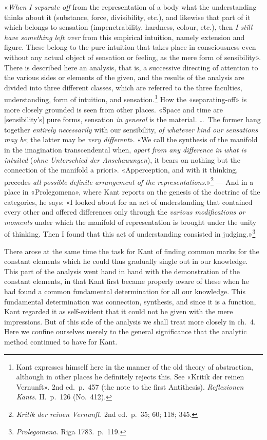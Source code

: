 \documentclass[12pt,a4paper]{article}
\newcommand{\opage}[1]{\marginnote{\footnotesize\textit{[#1]}}}
\begin{document}
«\emph{When I separate off} from the representation of a body what the
understanding thinks about it (substance, force, divisibility, etc.), and
likewise that part of it which belongs to sensation (impenetrability,
hardness, colour, etc.), then \emph{I still have something left over} from this
empirical intuition, namely extension and figure. These belong to the pure
intuition that takes place in consciousness even without any actual object
of sensation or feeling, as the mere form of sensibility». There is
described here an analysis, that is, a successive directing of attention to
the various sides or elements of the given, and the results of the analysis
are divided into three different classes, which are referred to the three
faculties, understanding, form of intuition, and sensation.\footnote{Kant
expresses himself here in the manner of the old theory of abstraction,
although in other places he definitely rejects this. See «Kritik der reinen
Vernunft». 2nd ed.\ p.\ 457 (the note to the first Antithesis).
\textit{Reflexionen Kants.} II.\ p.\ 126 (No.\ 412).} How the
«separating-off» is more closely grounded is seen from other places.
«Space and time are [sensibility's] pure forms, sensation \emph{in general} is the
material. \ldots\ The former hang together \emph{entirely necessarily} with our
sensibility, \emph{of whatever kind our sensations may be}; the latter may be \emph{very
different}». «We call the synthesis of the manifold in the imagination
transcendental when, \emph{apart from any difference in what is intuited} (\textit{ohne
Unterschied der Anschauungen}), it bears on nothing but the connection of
the manifold a priori». «Apperception, and with it thinking, precedes \emph{all
possible definite arrangement of the representations}.»\footnote{\textit{Kritik
der reinen Vernunft.} 2nd ed.\ p.\ 35; 60; 118; 345.} --- And in a place in
«Prolegomena», where Kant reports on the genesis of the doctrine of the
categories, he says: «I looked about for an act of understanding that
contained every other and offered differences only through the \emph{various
modifications or moments} under which the manifold of representation is
brought under the unity of thinking. Then I found that this act of
understanding consisted in judging.»\footnote{\textit{Prolegomena.} Riga
1783.\ p.\ 119.}

There arose at the same time the task for Kant of finding common marks for
the constant elements which he could thus gradually single out in our
knowledge. This \opage{28}part of the analysis went hand in hand with the
demonstration of the constant elements, in that Kant first became properly
aware of these when he had found a common fundamental determination for all
our knowledge. This fundamental determination was connection, synthesis,
and since it is a function, Kant regarded it as self-evident that it could
not be given with the mere impressions. But of this side of the analysis we
shall treat more closely in ch.\ 4. Here we confine ourselves merely to the
general significance that the analytic method continued to have for Kant.
\end{document}
